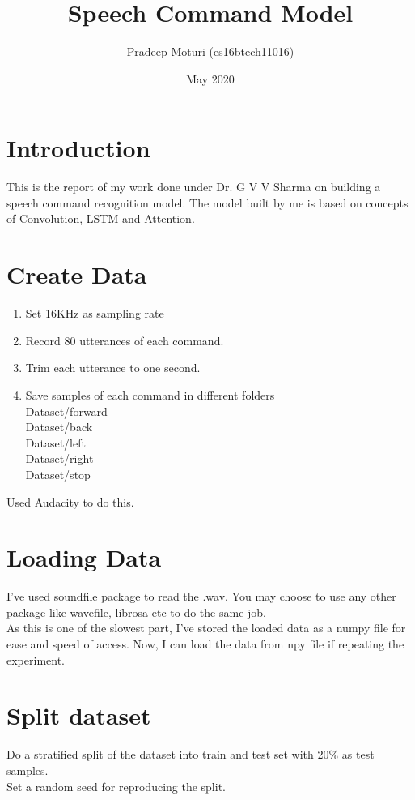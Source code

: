 \documentclass[11pt,english]{article}
\begin{document}
\title{Speech Command Model}
\author{Pradeep Moturi (es16btech11016)}
\date{May 2020}

\sloppy
\maketitle
\setlength{\columnsep}{0.5in}
\twocolumn
\tableofcontents

\section{Introduction}
This is the report of my work done under Dr. G V V Sharma on building a speech command recognition model. 
The model built by me is based on concepts of Convolution, LSTM and Attention.
\section{Create Data}
\begin{enumerate}
    \item Set 16KHz as sampling rate
    \item Record 80 utterances of each command.
    \item Trim each utterance to one second.
    \item Save samples of each command in different folders\\
        Dataset/forward\\
        Dataset/back\\
        Dataset/left\\
        Dataset/right\\
        Dataset/stop
\end{enumerate}
Used Audacity to do this.

\section{Loading Data}
I've used soundfile package to read the .wav. You may choose to use any other package like wavefile, librosa etc to do the same job.\\
As this is one of the slowest part, I've stored the loaded data as a numpy file for ease and speed of access. Now, I can load the data from npy file if repeating the experiment.

\section{Split dataset}
Do a stratified split of the dataset into train and test set with 20\% as test samples.\\
Set a random seed for reproducing the split.
\end{document}

